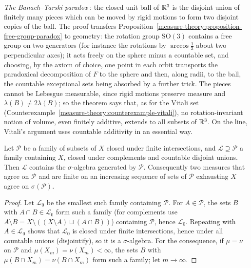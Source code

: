 \begin{remark}\label{measure-theory:remark-banach-tarski}
\emph{The Banach--Tarski paradox} \cite{banach-tarski-1924}: the closed unit ball of $\mathbb{R}^3$ is the disjoint union of finitely many pieces which can be moved by rigid motions to form two
disjoint copies of the ball. The proof transfers Proposition~\ref{measure-theory:proposition-free-group-paradox} to geometry: the rotation group $\mathrm{SO}(3)$ contains a free group on two generators (for
instance the rotations by $\arccos\frac13$ about two perpendicular axes); it acts freely on the sphere minus a countable set, and choosing, by the axiom of choice, one point in each orbit transports the
paradoxical decomposition of $F$ to the sphere and then, along radii, to the ball, the countable exceptional sets being absorbed by a further trick. The pieces cannot be Lebesgue measurable, since
rigid motions preserve measure and $\lambda(B) \neq 2\lambda(B)$; so the theorem says that, as for the Vitali set (Counterexample~\ref{measure-theory:counterexample-vitali}), no rotation-invariant notion
of volume, even finitely additive, extends to all subsets of $\mathbb{R}^3$. On the line, Vitali's argument uses countable additivity in an essential way.
\end{remark}

\begin{lemma}[Dynkin]\label{measure-theory:lemma-dynkin}
Let $\mathcal{P}$ be a family of subsets of $X$ closed under finite intersections, and $\mathcal{L} \supseteq \mathcal{P}$ a family containing $X$, closed under complements and countable disjoint unions.
Then $\mathcal{L}$ contains the $\sigma$-algebra generated by $\mathcal{P}$. Consequently two measures that agree on $\mathcal{P}$ and are finite on an increasing sequence of sets of $\mathcal{P}$ exhausting $X$ agree on
$\sigma(\mathcal{P})$.
\end{lemma}

\begin{proof}
Let $\mathcal{L}_0$ be the smallest such family containing $\mathcal{P}$. For $A \in \mathcal{P}$, the sets $B$ with $A \cap B \in \mathcal{L}_0$ form such a family (for complements use
$A \setminus B = X \setminus ((X \setminus A) \sqcup (A \cap B))$) containing $\mathcal{P}$, hence $\mathcal{L}_0$. Repeating with $A \in \mathcal{L}_0$ shows that $\mathcal{L}_0$ is closed under finite
intersections, hence under all countable unions (disjointify), so it is a $\sigma$-algebra. For the consequence, if $\mu = \nu$ on $\mathcal{P}$ and $\mu(X_m) = \nu(X_m) < \infty$, the sets $B$ with
$\mu(B \cap X_m) = \nu(B \cap X_m)$ form such a family; let $m \to \infty$.
\end{proof}

